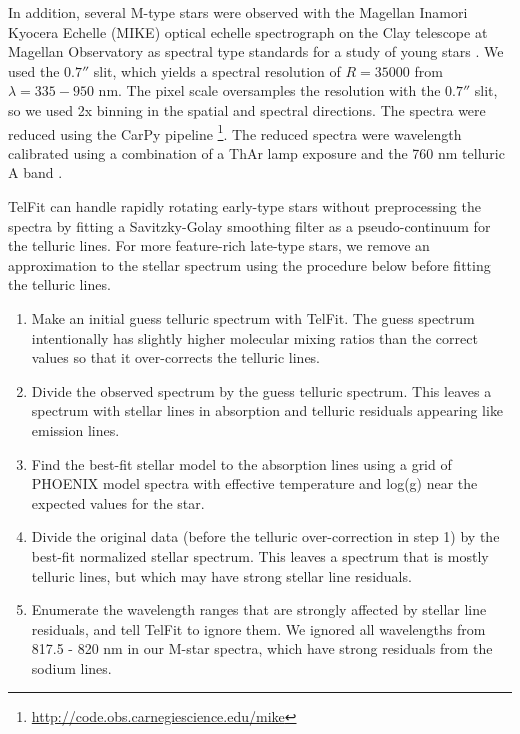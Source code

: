In addition, several M-type stars were observed with the Magellan Inamori Kyocera Echelle (MIKE) optical echelle spectrograph on the Clay telescope at Magellan Observatory as spectral type standards for a study of young stars \citep{Kraus2014}. We used the $0.7''$ slit, which yields a spectral resolution of $R = 35000$ from $\lambda = 335 - 950$ nm. The pixel scale oversamples the resolution with the $0.7''$ slit, so we used 2x binning in the spatial and spectral directions. The spectra were reduced using the CarPy pipeline \citep{Kelson2003}\footnote{\url{http://code.obs.carnegiescience.edu/mike}}. The reduced spectra were wavelength calibrated using a combination of a ThAr lamp exposure and the 760 nm telluric A band \citep[see][for details]{Kraus2014}.

TelFit can handle rapidly rotating early-type stars without preprocessing the spectra by fitting a Savitzky-Golay smoothing filter \citep{savitzky1964} as a pseudo-continuum for the telluric lines. For more feature-rich late-type stars, we remove an approximation to the stellar spectrum using the procedure below before fitting the telluric lines.

\begin{enumerate}
  \item Make an initial guess telluric spectrum with TelFit. The guess spectrum intentionally has slightly higher molecular mixing ratios than the correct values so that it over-corrects the telluric lines.
  \item Divide the observed spectrum by the guess telluric spectrum. This leaves a spectrum with stellar lines in absorption and telluric residuals appearing like emission lines.
  \item Find the best-fit stellar model to the absorption lines using a grid of PHOENIX model spectra \citep{Hauschildt1999} with effective temperature and log(g) near the expected values for the star.
  \item Divide the original data (before the telluric over-correction in step 1) by the best-fit normalized stellar spectrum. This leaves a spectrum that is mostly telluric lines, but which may have strong stellar line residuals.
  \item Enumerate the wavelength ranges that are strongly affected by stellar line residuals, and tell TelFit to ignore them. We ignored all wavelengths from 817.5 - 820 nm in our M-star spectra, which have strong residuals from the sodium lines.
\end{enumerate}

